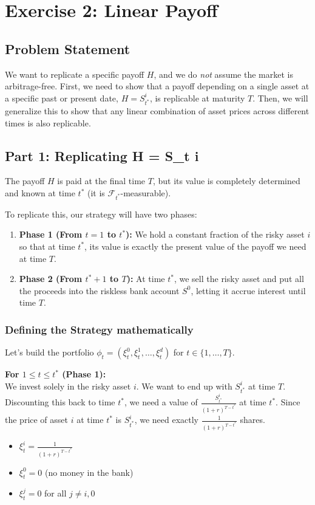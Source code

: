 \section{Exercise 2: Linear Payoff}

\subsection{Problem Statement}
We want to replicate a specific payoff $H$, and we do \emph{not} assume the market is arbitrage-free. 
First, we need to show that a payoff depending on a single asset at a specific past or present date, $H = S_{t^*}^i$, is replicable at maturity $T$. 
Then, we will generalize this to show that any linear combination of asset prices across different times is also replicable.

\subsection{Part 1: Replicating H = S\_t i}

The payoff $H$ is paid at the final time $T$, but its value is completely determined and known at time $t^*$ (it is $\mathcal{F}_{t^*}$-measurable). 

To replicate this, our strategy will have two phases:
\begin{enumerate}
    \item \textbf{Phase 1 (From $t=1$ to $t^*$):} We hold a constant fraction of the risky asset $i$ so that at time $t^*$, its value is exactly the present value of the payoff we need at time $T$.
    \item \textbf{Phase 2 (From $t^*+1$ to $T$):} At time $t^*$, we sell the risky asset and put all the proceeds into the riskless bank account $S^0$, letting it accrue interest until time $T$.
\end{enumerate}

\subsubsection*{Defining the Strategy mathematically}
Let's build the portfolio $\phi_t = (\xi_t^0, \xi_t^1, \dots, \xi_t^d)$ for $t \in \{1, \dots, T\}$.

\vspace{0.5em}
\noindent\textbf{For $1 \le t \le t^*$ (Phase 1):} \\
We invest solely in the risky asset $i$. We want to end up with $S_{t^*}^i$ at time $T$. Discounting this back to time $t^*$, we need a value of $\frac{S_{t^*}^i}{(1+r)^{T-t^*}}$ at time $t^*$. 
Since the price of asset $i$ at time $t^*$ is $S_{t^*}^i$, we need exactly $\frac{1}{(1+r)^{T-t^*}}$ shares.
\begin{itemize}
    \item $\xi_t^i = \frac{1}{(1+r)^{T-t^*}}$
    \item $\xi_t^0 = 0$ (no money in the bank)
    \item $\xi_t^j = 0$ for all $j \ne i, 0$
\end{itemize}

